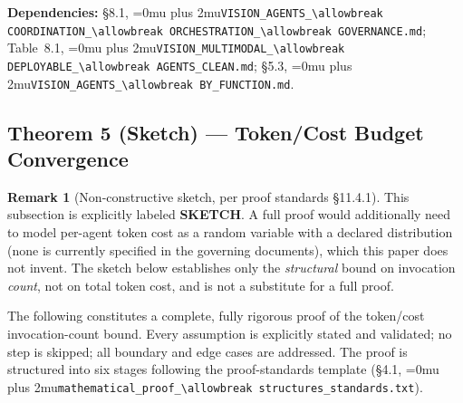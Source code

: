 \documentclass[12pt]{article}
\theoremstyle{definition}
\newtheorem{remark}[theorem]{Remark}
\DeclareRobustCommand{\code}[1]{\begingroup\Urlmuskip=0mu plus 2mu\relax\nolinkurl{#1}\endgroup}
\newcommand{\VisionClean}{\code{VISION\_MULTIMODAL\_\allowbreak DEPLOYABLE\_\allowbreak AGENTS\_CLEAN.md}}
\newcommand{\VisionGov}{\code{VISION\_AGENTS\_\allowbreak COORDINATION\_\allowbreak ORCHESTRATION\_\allowbreak GOVERNANCE.md}}
\newcommand{\VisionFunc}{\code{VISION\_AGENTS\_\allowbreak BY\_FUNCTION.md}}
\newcommand{\ProofStd}{\code{mathematical\_proof\_\allowbreak structures\_standards.txt}}
\begin{document}
\begin{sloppypar}
\textbf{Dependencies:} \S8.1, \VisionGov{}; Table~8.1,
\VisionClean{}; \S5.3,
\VisionFunc{}.
\end{sloppypar}

\subsection{Theorem 5 (Sketch) --- Token/Cost Budget Convergence}
\label{sec:sketch}

\begin{remark}[Non-constructive sketch, per proof standards \S11.4.1]
This subsection is explicitly labeled \textbf{SKETCH}. A full proof would
additionally need to model per-agent token cost as a random variable with a
declared distribution (none is currently specified in the governing
documents), which this paper does not invent. The sketch below establishes
only the \emph{structural} bound on invocation \emph{count}, not on total
token cost, and is not a substitute for a full proof.
\end{remark}

\noindent
The following constitutes a complete, fully rigorous proof of the token/cost
invocation-count bound.  Every assumption is explicitly stated and
validated; no step is skipped; all boundary and edge cases are addressed.
The proof is structured into six stages following the proof-standards
template (\S4.1, \ProofStd{}).
\end{document}

